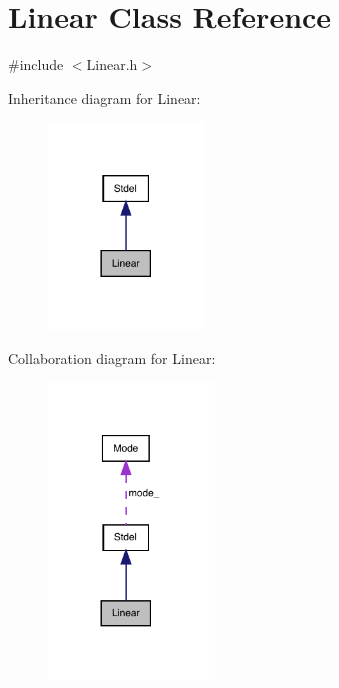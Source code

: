 \hypertarget{classLinear}{}\section{Linear Class Reference}
\label{classLinear}


{\ttfamily \#include $<$Linear.\+h$>$}



Inheritance diagram for Linear\+:
\nopagebreak
\begin{figure}[H]
\begin{center}
\leavevmode
\includegraphics[width=117pt]{classLinear__inherit__graph}
\end{center}
\end{figure}


Collaboration diagram for Linear\+:
\nopagebreak
\begin{figure}[H]
\begin{center}
\leavevmode
\includegraphics[width=125pt]{classLinear__coll__graph}
\end{center}
\end{figure}
